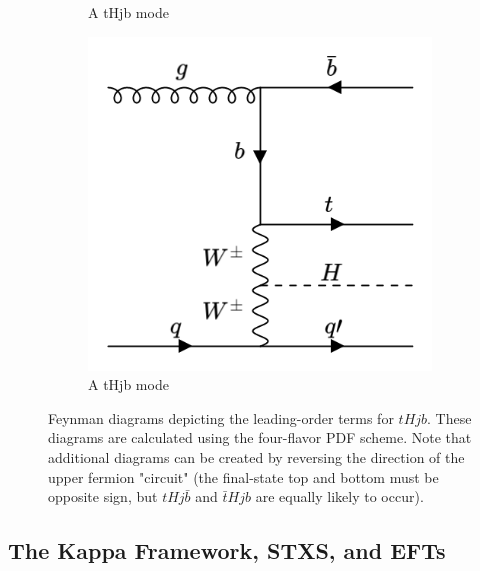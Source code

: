 \begin{figure}[htp]
\begin{subfigure}[b]{0.3\textwidth}
         \caption{A tHjb mode}
         \label{fig:tHjb4}
     \end{subfigure}
     \hfill
         \begin{subfigure}[b]{0.3\textwidth}
         \centering
         \includegraphics[width=\textwidth]{figures/theory_chapter/tHjb5.png}
         \caption{A tHjb mode}
         \label{fig:tHjb5}
     \end{subfigure}
  \label{fig:tHjbmodes}
  \caption{Feynman diagrams depicting the leading-order terms for $tHjb$. These diagrams are calculated using the four-flavor PDF scheme. Note that additional diagrams can be created by reversing the direction of the upper fermion "circuit" (the final-state top and bottom must be opposite sign, but $tHj\bar{b}$ and $\bar{t}Hjb$ are equally likely to occur).}  
\end{figure}

\subsection{The Kappa Framework, STXS, and EFTs} \label{sec:kappaFW}

